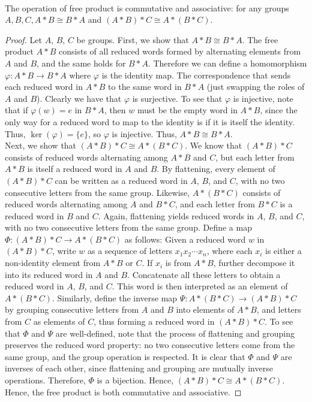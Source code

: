 \documentclass{article}
\begin{document}
\begin{problem}[1.9.10] \\ 
    The operation of free product is commutative and associative: for any groups $A,B,C, A * B \cong B * A$ and $(A * B) * C \cong A * (B * C)$.
\end{problem}

\begin{proof}
    Let $A$, $B$, $C$ be groups. First, we show that $A * B \cong B * A$. The free product $A * B$ consists of all reduced words formed by alternating elements from $A$ and $B$, and the same holds for $B * A$. Therefore we can define a homomorphism $\varphi : A * B \to B*A$ where $\varphi$ is the identity map. The correspondence that sends each reduced word in $A * B$ to the same word in $B * A$ (just swapping the roles of $A$ and $B$). Clearly we have that $\varphi$ is surjective. To see that $\varphi$ is injective, note that if $\varphi(w) = e$ in $B * A$, then $w$ must be the empty word in $A * B$, since the only way for a reduced word to map to the identity is if it is itself the identity. Thus, $\ker(\varphi) = \{e\}$, so $\varphi$ is injective. Thus, $A * B \cong B * A$. \\ 
    Next, we show that $(A * B) * C \cong A * (B * C)$. We know that $(A * B) * C$ consists of reduced words alternating among $A * B$ and $C$, but each letter from $A * B$ is itself a reduced word in $A$ and $B$. By flattening, every element of $(A * B) * C$ can be written as a reduced word in $A$, $B$, and $C$, with no two consecutive letters from the same group. Likewise, $A * (B * C)$ consists of reduced words alternating among $A$ and $B * C$, and each letter from $B * C$ is a reduced word in $B$ and $C$. Again, flattening yields reduced words in $A$, $B$, and $C$, with no two consecutive letters from the same group. Define a map $\Phi: (A * B) * C \to A * (B * C)$ as follows: Given a reduced word $w$ in $(A * B) * C$, write $w$ as a sequence of letters $x_1 x_2 \cdots x_n$, where each $x_i$ is either a non-identity element from $A * B$ or $C$. If $x_i$ is from $A * B$, further decompose it into its reduced word in $A$ and $B$. Concatenate all these letters to obtain a reduced word in $A$, $B$, and $C$. This word is then interpreted as an element of $A * (B * C)$. Similarly, define the inverse map $\Psi: A * (B * C) \to (A * B) * C$ by grouping consecutive letters from $A$ and $B$ into elements of $A * B$, and letters from $C$ as elements of $C$, thus forming a reduced word in $(A * B) * C$. To see that $\Phi$ and $\Psi$ are well-defined, note that the process of flattening and grouping preserves the reduced word property: no two consecutive letters come from the same group, and the group operation is respected. It is clear that $\Phi$ and $\Psi$ are inverses of each other, since flattening and grouping are mutually inverse operations. Therefore, $\Phi$ is a bijection. Hence, $(A * B) * C \cong A * (B * C)$. \\
    Hence, the free product is both commutative and associative.
\end{proof}
\end{document}
